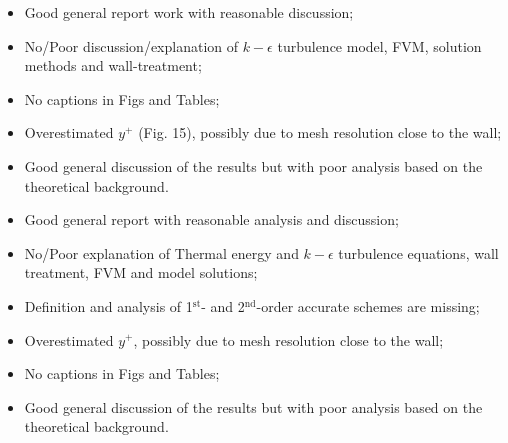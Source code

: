 \documentclass[14pt,twoside]{report}
\newcommand\blankpage{%
    \null
    \thispagestyle{empty}%
    \addtocounter{page}{-1}%
    \newpage}
\begin{document}
\clearpage 




\bigskip


\medskip

  \begin{itemize}
%
     \item Good general report work with reasonable discussion;
     \item No/Poor discussion/explanation of $k-\epsilon$ turbulence model, FVM, solution methods and wall-treatment;
     \item No captions in Figs and Tables;
     \item Overestimated $y^{+}$ (Fig. 15), possibly due to mesh resolution close to the wall;
     \item Good general discussion of the results but with poor analysis based on the theoretical background.
%
  \end{itemize}%

\clearpage 



\bigskip


\medskip

  \begin{itemize}
%
     \item Good general report with reasonable analysis and discussion;
     \item No/Poor explanation of Thermal energy and $k-\epsilon$ turbulence equations, wall treatment, FVM and model solutions;
     \item Definition and analysis of 1$^{\text{st}}$- and 2$^{\text{nd}}$-order accurate schemes are missing;
     \item Overestimated $y^{+}$, possibly due to mesh resolution close to the wall;
     \item No captions in Figs and Tables;
     \item Good general discussion of the results but with poor analysis based on the theoretical background.
%
  \end{itemize}%
\end{document}
